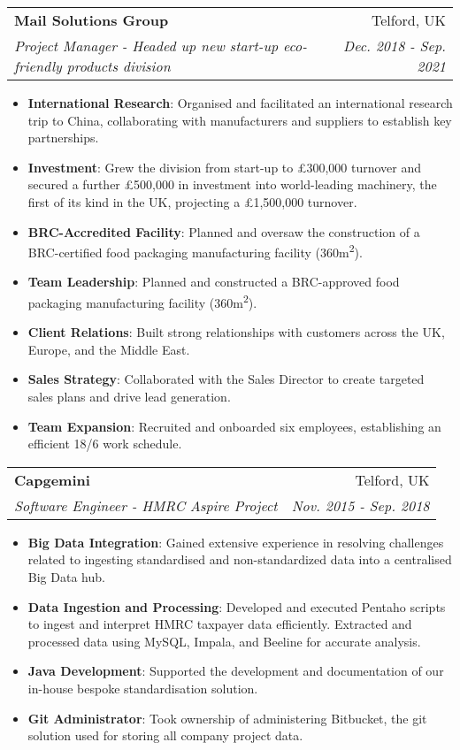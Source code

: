 \documentclass[letterpaper,11pt]{article}
\makeatletter
\newcommand{\resumeItem}[2]{
  \item\small{
    \textbf{#1}{: #2 \vspace{-2pt}}
  }
}
\newcommand{\resumeSubheading}[4]{
  \vspace{-1pt}\item
    \begin{tabular*}{0.97\textwidth}{l@{\extracolsep{\fill}}r}
      \textbf{#1} & #2 \\
      \textit{\small#3} & \textit{\small #4} \\
    \end{tabular*}\vspace{-5pt}
}
\newcommand{\resumeItemListStart}{\begin{itemize}}
\newcommand{\resumeItemListEnd}{\end{itemize}\vspace{-5pt}}
\makeatother
\begin{document}
    \resumeSubheading
      {Mail Solutions Group}{Telford, UK}
      {Project Manager - Headed up new start-up eco-friendly products division}{Dec. 2018 - Sep. 2021}
      \resumeItemListStart
      \resumeItem{International Research}
          {Organised and facilitated an international research trip to China, collaborating with manufacturers and suppliers to establish key partnerships.}
        \resumeItem{Investment}
          {Grew the division from start-up to £300,000 turnover and secured a further £500,000 in investment into world-leading machinery, the first of its kind in the UK, projecting a £1,500,000 turnover.}
        \resumeItem{BRC-Accredited Facility}
          {Planned and oversaw the construction of a BRC-certified food packaging manufacturing facility (360m\textsuperscript{2}).}
           \resumeItem{Team Leadership}
          {Planned and constructed a BRC-approved food packaging manufacturing facility (360m\textsuperscript{2}).}
          \resumeItem{Client Relations}
          {Built strong relationships with customers across the UK, Europe, and the Middle East.}
           \resumeItem{Sales Strategy}
          {Collaborated with the Sales Director to create targeted sales plans and drive lead generation. }
           \resumeItem{Team Expansion}
          {Recruited and onboarded six employees, establishing an efficient 18/6 work schedule.}
      \resumeItemListEnd

    \resumeSubheading
      {Capgemini}{Telford, UK}
      {Software Engineer - HMRC Aspire Project}{Nov. 2015 - Sep. 2018}
      \resumeItemListStart
        \resumeItem{Big Data Integration}
          {Gained extensive experience in resolving challenges related to ingesting standardised and non-standardized data into a centralised Big Data hub.}
          \resumeItem{Data Ingestion and Processing}
          {Developed and executed Pentaho scripts to ingest and interpret HMRC taxpayer data efficiently. Extracted and processed data using MySQL, Impala, and Beeline for accurate analysis.}
          \resumeItem{Java Development}
          {Supported the development and documentation of our in-house bespoke standardisation solution.}
          \resumeItem{Git Administrator}
          {Took ownership of administering Bitbucket, the git solution used for storing all company project data.}
      \resumeItemListEnd
      
\end{document}

